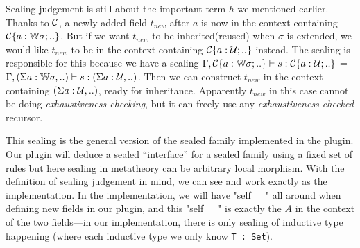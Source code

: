Sealing judgement is still about the important term $h$ we mentioned
earlier. Thanks to ${\mathcal{C}}$, a newly added field $t_{new}$ after $a$  is now in the
context containing ${\mathcal{C}}\{a : {\mathbb{W}} \sigma; ..\}$.
But if we want $t_{new}$ to be inherited(reused) when $\sigma$ is
extended, we would like $t_{new}$ to be in the context containing
${\mathcal{C}}\{a : {\mathcal{U}}; ..\}$ instead. The sealing is responsible for this
because we have a sealing ${ {\Gamma, {\mathcal{C}}\{a : {\mathbb{W}} \sigma;
..\}} \vdash {s} : {{\mathcal{C}}\{a : {\mathcal{U}}; ..\}} }$ = ${ {\Gamma, (\Sigma a : {\mathbb{W}}
\sigma,..)} \vdash {s} : {(\Sigma a : {\mathcal{U}},..)} }$. Then we can construct
$t_{new}$ in the context containing $(\Sigma a : {\mathcal{U}},..)$, ready for
inheritance.
Apparently $t_{new}$ in this case cannot be doing \textit{exhaustiveness
checking}, but it can freely use any \textit{exhaustiveness-checked}
recursor.




This sealing is the general version of the sealed family implemented in the plugin. Our plugin will deduce a sealed ``interface'' for a sealed family using a fixed set of rules but here sealing in metatheory can be arbitrary local morphism. With the definition of sealing judgement in mind, we can see
 and  work exactly as the
implementation. In the implementation, we will have "self__" all around
when defining new fields in our plugin, and this "self__" is exactly the
$A$ in the context of the two fields---in our implementation, there is only sealing of inductive type happening (where each inductive type we only know \texttt{T : Set}).

